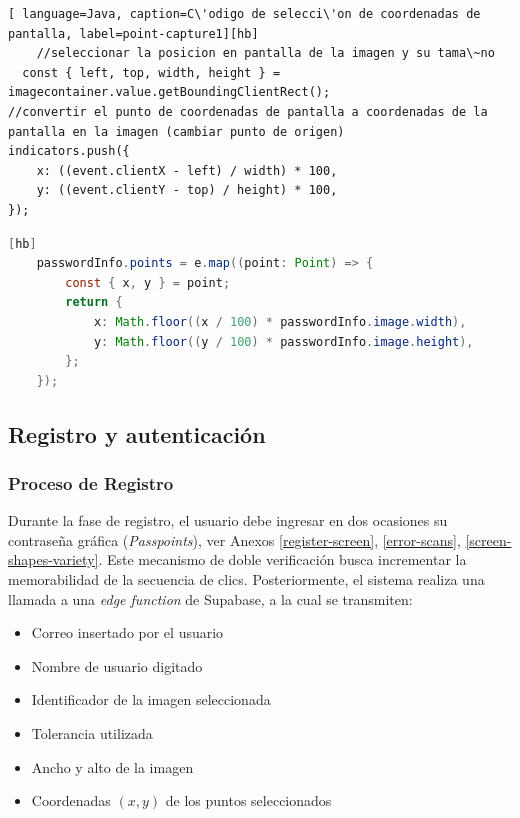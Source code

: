 \begin{lstlisting}[ language=Java, caption=C\'odigo de selecci\'on de coordenadas de pantalla, label=point-capture1][hb]
	//seleccionar la posicion en pantalla de la imagen y su tama\~no
  const { left, top, width, height } =
imagecontainer.value.getBoundingClientRect();
//convertir el punto de coordenadas de pantalla a coordenadas de la pantalla en la imagen (cambiar punto de origen)
indicators.push({
	x: ((event.clientX - left) / width) * 100,
	y: ((event.clientY - top) / height) * 100,
});

\end{lstlisting}


\begin{lstlisting}[style=mystyle, language=Java, caption=C\'odigo de transformaci\'on en coordenadas de imagen, label=point-capture2][hb]
	passwordInfo.points = e.map((point: Point) => {
		const { x, y } = point;
		return {
			x: Math.floor((x / 100) * passwordInfo.image.width),
			y: Math.floor((y / 100) * passwordInfo.image.height),
		};
	});
\end{lstlisting}

\subsection{Registro y autenticaci\'on}
\subsubsection{Proceso de Registro}
Durante la fase de registro, el usuario debe ingresar en dos ocasiones su contraseña gráfica (\textit{Passpoints}), ver Anexos \ref{register-screen}, \ref{error-scans}, \ref{screen-shapes-variety}. Este mecanismo de doble verificación busca incrementar la memorabilidad de la secuencia de clics. Posteriormente, el sistema realiza una llamada a una \textit{edge function} de Supabase, a la cual se transmiten:

\begin{itemize}
	\item Correo insertado por el usuario
	\item Nombre de usuario digitado
	\item Identificador de la imagen seleccionada
	\item Tolerancia utilizada 
	\item Ancho y alto de la imagen
	\item Coordenadas $(x,y)$ de los puntos seleccionados
\end{itemize}

